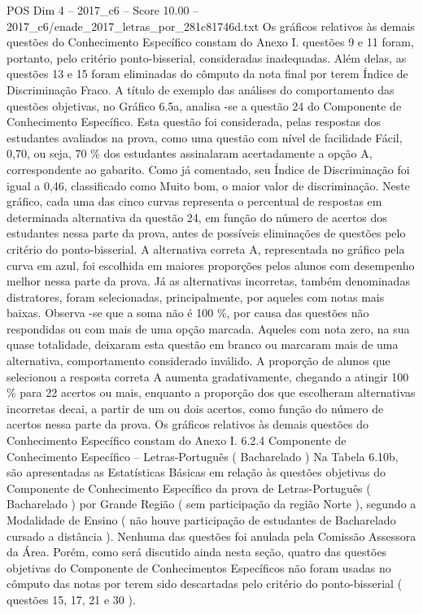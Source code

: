 \begin{textsample}{POS Dim 4 – 2017\_c6 – Score 10.00 – 2017\_c6/enade\_2017\_letras\_por\_281c81746d.txt}
Os gráficos relativos às demais questões do Conhecimento Específico constam do Anexo I. questões 9 e 11 foram, portanto, pelo critério ponto-bisserial, consideradas inadequadas.
Além delas, as questões 13 e 15 foram eliminadas do cômputo da nota final por terem Índice de Discriminação Fraco.
A título de exemplo das análises do comportamento das questões objetivas, no Gráfico 6.5a, analisa -se a questão 24 do Componente de Conhecimento Específico.
Esta questão foi considerada, pelas respostas dos estudantes avaliados na prova, como uma questão com nível de facilidade Fácil, 0,70, ou seja, 70 \% dos estudantes assinalaram acertadamente a opção A, correspondente ao gabarito.
Como já comentado, seu Índice de Discriminação foi igual a 0,46, classificado como Muito bom, o maior valor de discriminação.
Neste gráfico, cada uma das cinco curvas representa o percentual de respostas em determinada alternativa da questão 24, em função do número de acertos dos estudantes nessa parte da prova, antes de possíveis eliminações de questões pelo critério do ponto-bisserial.
A alternativa correta A, representada no gráfico pela curva em azul, foi escolhida em maiores proporções pelos alunos com desempenho melhor nessa parte da prova.
Já as alternativas incorretas, também denominadas distratores, foram selecionadas, principalmente, por aqueles com notas mais baixas.
Observa -se que a soma não é 100 \%, por causa das questões não respondidas ou com mais de uma opção marcada.
Aqueles com nota zero, na sua quase totalidade, deixaram esta questão em branco ou marcaram mais de uma alternativa, comportamento considerado inválido.
A proporção de alunos que selecionou a resposta correta A aumenta gradativamente, chegando a atingir 100 \% para 22 acertos ou mais, enquanto a proporção dos que escolheram alternativas incorretas decai, a partir de um ou dois acertos, como função do número de acertos nessa parte da prova.
Os gráficos relativos às demais questões do Conhecimento Específico constam do Anexo I. 6.2.4 Componente de Conhecimento Específico – Letras-Português ( Bacharelado ) Na Tabela 6.10b, são apresentadas as Estatísticas Básicas em relação às questões objetivas do Componente de Conhecimento Específico da prova de Letras-Português ( Bacharelado ) por Grande Região ( sem participação da região Norte ), segundo a Modalidade de Ensino ( não houve participação de estudantes de Bacharelado cursado a distância ).
Nenhuma das questões foi anulada pela Comissão Assessora da Área.
Porém, como será discutido ainda nesta seção, quatro das questões objetivas do Componente de Conhecimentos Específicos não foram usadas no cômputo das notas por terem sido descartadas pelo critério do ponto-bisserial ( questões 15, 17, 21 e 30 ).

\end{textsample}
